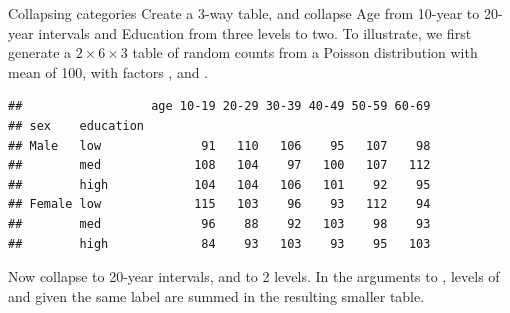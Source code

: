 \documentclass[11pt]{book}
\renewenvironment{knitrout}{\small\renewcommand{\baselinestretch}{.85}}{} %
\begin{document}
\begin{Example}{Collapsing categories}
Create a 3-way table, and collapse Age from 10-year to 20-year intervals
and Education from three levels to two.
To illustrate, we first generate a $2 \times 6 \times 3$ table of random counts from a 
Poisson distribution with mean of 100, with factors , 
and .
\begin{knitrout}
\color{fgcolor}\begin{kframe}
\begin{alltt}
 \hlkwb{<-} \hlstd{(}\hlstd{,} \hlstd{)}
 \hlkwb{<-} \hlstd{(}\hlstd{,} \hlstd{,}  \hlstd{,} \hlstd{,} \hlstd{,} \hlstd{)}
 \hlkwb{<-} \hlstd{(}\hlstd{,} \hlstd{,} \hlstd{)}
 \hlkwb{<-} \hlstd{(}  
 \hlkwb{<-} \hlstd{(}\hlstd{,} \hlstd{)}   
 \hlkwb{<-} 
 \hlkwb{<-}  \hlopt{~}  \hlopt{+}  \hlopt{+}  
\end{alltt}
\begin{verbatim}
##                  age 10-19 20-29 30-39 40-49 50-59 60-69
## sex    education                                        
## Male   low              91   110   106    95   107    98
##        med             108   104    97   100   107   112
##        high            104   104   106   101    92    95
## Female low             115   103    96    93   112    94
##        med              96    88    92   103    98    93
##        high             84    93   103    93    95   103
\end{verbatim}
\end{kframe}
\end{knitrout}
Now collapse  to 20-year intervals, and 
to 2 levels. In the arguments to , levels of  and 
given the same label are summed in the resulting smaller table.
\begin{knitrout}

\end{knitrout}
\end{Example}
\end{document}
